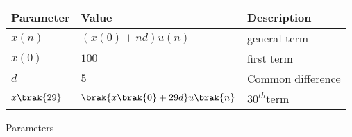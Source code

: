 \setlength{\arrayrulewidth}{0.3mm}
\setlength{\tabcolsep}{15pt}
\renewcommand{\arraystretch}{1.5}



\begin{tabular}{ |p{1cm}|p{2cm}|p{2cm}| }
\hline
Parameter & Value & Description\\
\hline
$x(n)$ & $(x(0)+nd)u(n)$ & general term \\ \hline
$x(0)$ & $100$ & first term\\ \hline
$d$ & $5$ & Common difference\\ \hline
$x\brak{29}$ & $\brak{x\brak{0} + 29d}u\brak{n}$ & $30^{th}$term\\ \hline 

\end{tabular}
\caption{Parameters}


